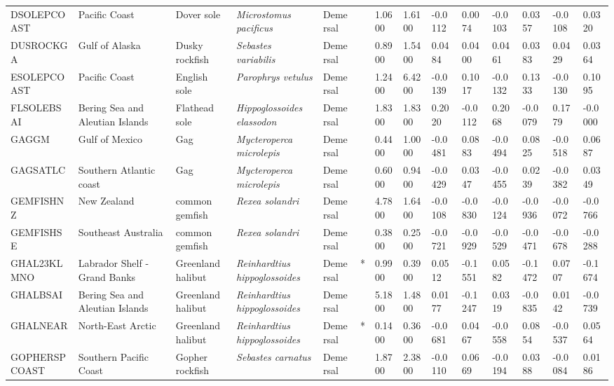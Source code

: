 \begin{longtable}{p{2.8cm}p{2cm}p{1.7cm}p{1.7cm}p{1cm}p{0.3cm}p{1cm}p{1cm}p{1cm}p{1cm}p{1cm}p{1cm}p{1cm}p{1cm}}
  DSOLEPCOAST & Pacific Coast & Dover sole & \textit{Microstomus pacificus} & Demersal &   & 1.0600 & 1.6100 & -0.0112 & 0.0074 & -0.0103 & 0.0357 & -0.0108 & 0.0320 \\ 
  DUSROCKGA & Gulf of Alaska & Dusky rockfish & \textit{Sebastes variabilis} & Demersal &   & 0.8900 & 1.5400 & 0.0484 & 0.0400 & 0.0461 & 0.0383 & 0.0429 & 0.0364 \\ 
  ESOLEPCOAST & Pacific Coast & English sole & \textit{Parophrys vetulus} & Demersal &   & 1.2400 & 6.4200 & -0.0139 & 0.1017 & -0.0132 & 0.1333 & -0.0130 & 0.1095 \\ 
  FLSOLEBSAI & Bering Sea and Aleutian Islands & Flathead sole & \textit{Hippoglossoides elassodon} & Demersal &   & 1.8300 & 1.8300 & 0.2020 & -0.0112 & 0.2068 & -0.0079 & 0.1779 & -0.0000 \\ 
  GAGGM & Gulf of Mexico & Gag & \textit{Mycteroperca microlepis} & Demersal &   & 0.4400 & 1.0000 & -0.0481 & 0.0883 & -0.0494 & 0.0825 & -0.0518 & 0.0687 \\ 
  GAGSATLC & Southern Atlantic coast & Gag & \textit{Mycteroperca microlepis} & Demersal &   & 0.6000 & 0.9400 & -0.0429 & 0.0347 & -0.0455 & 0.0239 & -0.0382 & 0.0349 \\ 
  GEMFISHNZ & New Zealand & common gemfish & \textit{Rexea solandri} & Demersal &   & 4.7800 & 1.6400 & -0.0108 & -0.0830 & -0.0124 & -0.0936 & -0.0072 & -0.0766 \\ 
  GEMFISHSE & Southeast Australia & common gemfish & \textit{Rexea solandri} & Demersal &   & 0.3800 & 0.2500 & -0.0721 & -0.0929 & -0.0529 & -0.0471 & -0.0678 & -0.0288 \\ 
  GHAL23KLMNO & Labrador Shelf - Grand Banks & Greenland halibut & \textit{Reinhardtius hippoglossoides} & Demersal & * & 0.9900 & 0.3900 & 0.0512 & -0.1551 & 0.0582 & -0.1472 & 0.0707 & -0.1674 \\ 
  GHALBSAI & Bering Sea and Aleutian Islands & Greenland halibut & \textit{Reinhardtius hippoglossoides} & Demersal &   & 5.1800 & 1.4800 & 0.0177 & -0.1247 & 0.0319 & -0.0835 & 0.0142 & -0.0739 \\ 
  GHALNEAR & North-East Arctic & Greenland halibut & \textit{Reinhardtius hippoglossoides} & Demersal & * & 0.1400 & 0.3600 & -0.0681 & 0.0467 & -0.0558 & 0.0854 & -0.0537 & 0.0564 \\ 
  GOPHERSPCOAST & Southern Pacific Coast & Gopher rockfish & \textit{Sebastes carnatus} & Demersal &   & 1.8700 & 2.3800 & -0.0110 & 0.0669 & -0.0194 & 0.0388 & -0.0084 & 0.0186 \\ 

\end{longtable}

